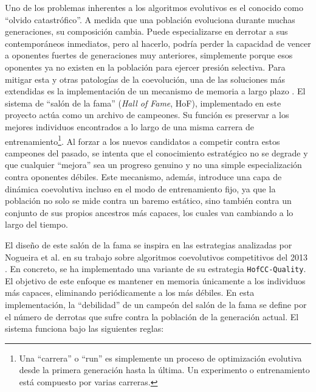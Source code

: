 Uno de los problemas inherentes a los algoritmos evolutivos es el conocido como ``olvido catastrófico''. A medida que una población evoluciona durante muchas generaciones, su composición cambia. Puede especializarse en derrotar a sus contemporáneos inmediatos, pero al hacerlo, podría perder la capacidad de vencer a oponentes fuertes de generaciones muy anteriores, simplemente porque esos oponentes ya no existen en la población para ejercer presión selectiva. Para mitigar esta y otras patologías de la coevolución, una de las soluciones más extendidas es la implementación de un mecanismo de memoria a largo plazo \cite{mariela_nogueira_analysis_2013}. El sistema de ``salón de la fama'' (\textit{Hall of Fame}, HoF), implementado en este proyecto actúa como un archivo de campeones. Su función es preservar a los mejores individuos encontrados a lo largo de una misma carrera de entrenamiento\footnote{Una ``carrera'' o ``run'' es simplemente un proceso de optimización evolutiva desde la primera generación hasta la última. Un experimento o entrenamiento está compuesto por varias carreras.}. Al forzar a los nuevos candidatos a competir contra estos campeones del pasado, se intenta que el conocimiento estratégico no se degrade y que cualquier ``mejora'' sea un progreso genuino y no una simple especialización contra oponentes débiles. Este mecanismo, además, introduce una capa de dinámica coevolutiva incluso en el modo de entrenamiento fijo, ya que la población no solo se mide contra un baremo estático, sino también contra un conjunto de sus propios ancestros más capaces, los cuales van cambiando a lo largo del tiempo.

El diseño de este salón de la fama se inspira en las estrategias analizadas por Nogueira et al. en su trabajo sobre algoritmos coevolutivos competitivos del 2013 \cite{mariela_nogueira_analysis_2013}. En concreto, se ha implementado una variante de su estrategia \texttt{HofCC-Quality}. El objetivo de este enfoque es mantener en memoria únicamente a los individuos más capaces, eliminando periódicamente a los más débiles. En esta implementación, la ``debilidad'' de un campeón del salón de la fama se define por el número de derrotas que sufre contra la población de la generación actual. El sistema funciona bajo las siguientes reglas:

